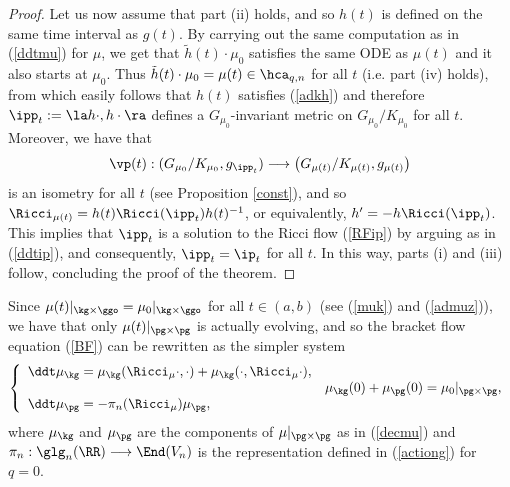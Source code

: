 \documentclass[11pt]{amsart}
\theoremstyle{plain}
\theoremstyle{definition}
\theoremstyle{remark}
\begin{document}
\begin{proof}
Let us now assume that part (ii) holds, and so $h(t)$ is defined on the same time interval as $g(t)$.  By carrying out the same computation as in (\ref{ddtmu}) for $\mu$, we get that $\tilde{h}(t)\cdot\mu_0$ satisfies the same ODE as $\mu(t)$ and it also starts at $\mu_0$.  Thus $\tilde{h}(t)\cdot\mu_0=\mu(t)\in\hca_{q,n}$ for all $t$ (i.e. part (iv) holds), from which easily follows that $h(t)$ satisfies (\ref{adkh}) and therefore $\ipp_t:=\la h\cdot,h\cdot\ra$ defines a $G_{\mu_0}$-invariant metric on $G_{\mu_0}/K_{\mu_0}$ for all $t$.  Moreover, we have that
$$
\vp(t):(G_{\mu_0}/K_{\mu_0},g_{\ipp_t})\longrightarrow \left(G_{\mu(t)}/K_{\mu(t)},g_{\mu(t)}\right)
$$
is an isometry for all $t$ (see Proposition \ref{const}), and so  $\Ricci_{\mu(t)}=h(t)\Ricci(\ipp_t)h(t)^{-1}$, or equivalently, $h'=-h\Ricci(\ipp_t)$.  This implies that $\ipp_t$ is a solution to the Ricci flow (\ref{RFip}) by arguing as in (\ref{ddtip}), and consequently, $\ipp_t=\ip_t$ for all $t$.  In this way, parts (i) and (iii) follow, concluding the proof of the theorem.
\end{proof}


Since $\mu(t)|_{\kg\times\ggo}=\mu_0|_{\kg\times\ggo}$ for all $t\in (a,b)$ (see (\ref{muk})
and (\ref{admuz})), we have that only $\mu(t)|_{\pg\times\pg}$ is actually evolving, and so the bracket flow equation (\ref{BF}) can be rewritten as the simpler system
\begin{equation}\label{BFsis}
\left\{\begin{array}{ll}
\ddt\mu_{\kg}=\mu_{\kg}(\Ricci_{\mu}\cdot,\cdot)+\mu_{\kg}(\cdot,\Ricci_{\mu}\cdot), & \\
& \mu_{\kg}(0)+\mu_{\pg}(0)=\mu_0|_{\pg\times\pg},\\
\ddt\mu_{\pg}=-\pi_n(\Ricci_{\mu})\mu_{\pg}, &
\end{array}\right.
\end{equation}
where $\mu_{\kg}$ and $\mu_{\pg}$ are the components of $\mu|_{\pg\times\pg}$ as in (\ref{decmu}) and $\pi_n:\glg_n(\RR)\longrightarrow\End(V_n)$ is the  representation defined in (\ref{actiong}) for $q=0$.
\end{document}
